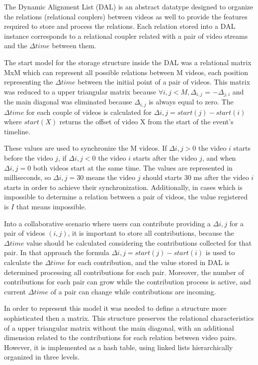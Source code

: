 
The Dynamic Alignment List (DAL) is an abstract datatype designed to organize the relations (relational couplers) between videos as well to provide the features required to store and process the relations. Each relation stored into a DAL instance corresponds to a relational coupler related with a pair of video streams and the $\Delta{time}$ between them.


The start model for the storage structure inside the DAL was a relational matrix MxM which can represent all possible relations between M videos, each position representing the $\Delta{time}$ between the initial point of a pair of videos. This matrix was reduced to a upper triangular matrix because $\forall{i,j} < M , \Delta_{i,j}$ = $- \Delta_{j,i}$ and the main diagonal was eliminated because $\Delta_{i,j}$ is always equal to zero. The $\Delta{time}$ for each couple of videos is calculated for $\Delta{i,j} = start(j) - start(i)$ where $start(X)$ returns the offset of video X from the start of the event's timeline.

These values are used to synchronize the M videos. If $\Delta{i,j} > 0$ the video $i$ starts before the video $j$, if $\Delta{i,j} < 0$ the video $i$ starts after the video $j$, and when $\Delta{i,j} = 0$ both videos start at the same time. The values are represented in milliseconds, so $\Delta{i,j} = 30$ means the video $j$ should starts 30 ms after the video $i$ starts in order to achieve their synchronization. Additionally, in cases which is impossible to determine a relation between a pair of videos, the value registered is $I$ that means impossible.

Into a collaborative scenario where users can contribute providing a $\Delta{i,j}$ for a pair of videos $(i,j)$, it is important to store all contributions, because the $\Delta{time}$ value should be calculated considering the contributions collected for that pair. In that approach the formula $\Delta{i,j} = start(j) - start(i)$  is used to calculate the $\Delta{time}$ for each contribution, and the value stored in DAL is determined processing all contributions for each pair. Moreover, the number of contributions for each pair can grow while the contribution process is active, and current $\Delta{time}$ of a pair can change while contributions are incoming.

In order to represent this model it was needed to define a structure more sophisticated then a matrix. This structure preserves the relational characteristics of a upper triangular matrix without the main diagonal, with an additional dimension related to the contributions for each relation between video pairs. However, it is implemented as a hash table, using linked lists hierarchically organized in three levels. 

